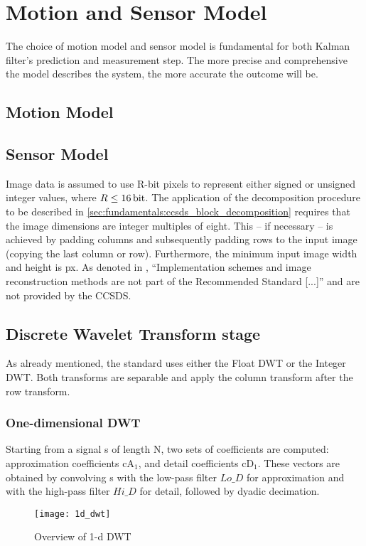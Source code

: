 \chapter{Motion and Sensor Model\label{cha:chapter3}}

The choice of motion model and sensor model is fundamental for both Kalman filter's prediction and measurement step. The more precise and comprehensive the model describes the system, the more accurate the outcome will be. 

\section{Motion Model}\label{sub:Motion Model}


\section{Sensor Model}\label{sub:Sensor Model}


Image data is assumed to use R-bit pixels to represent either signed or unsigned integer values, where $R\leq\unit[16]{bit}$. The application of the decomposition procedure to be described in \autoref{sec:fundamentals:ccsds_block_decomposition} requires that the image dimensions are integer multiples of eight. This -- if necessary -- is achieved by padding columns and subsequently padding rows to the input image (copying the last column or row). Furthermore, the minimum input image width and height is \unit[17]{px}. As denoted in \cite{CCSDS122blue}, ``Implementation schemes and image reconstruction methods are not part of the Recommended Standard [...]'' and are not provided by the \gls{CCSDS}.

\section{Discrete Wavelet Transform stage}\label{sec:fundamentals:ccsds_dwt}
As already mentioned, the standard uses either the Float DWT or the Integer DWT. Both transforms are separable and apply the column transform after the row transform.

\subsection{One-dimensional DWT}\label{subsec:1d_dwt}
Starting from a signal s of length N, two sets of coefficients are computed: approximation coefficients $\mathrm{cA}_1$, and detail coefficients $\mathrm{cD}_1$. These vectors are obtained by convolving s with the low-pass filter $Lo\_D$ for approximation and with the high-pass filter $Hi\_D$ for detail, followed by dyadic decimation.
\begin{figure}[tb]
  \centering
  \texttt{[image: 1d\_dwt]}
  \caption{Overview of 1-d DWT}
  \label{fig:ccsds:1d_dwt_overview}
\end{figure}
